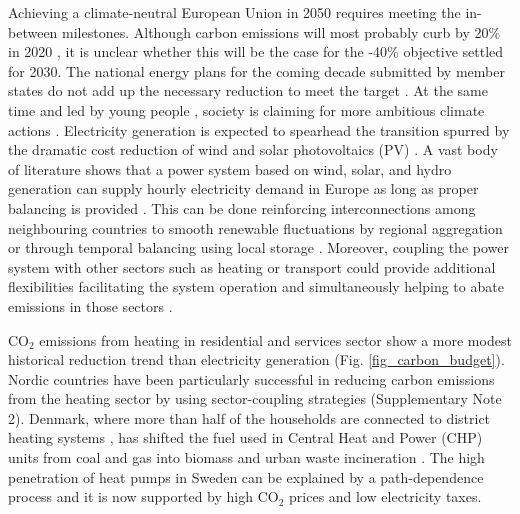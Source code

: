 \documentclass[5p]{elsarticle} %
\begin{document}
Achieving a climate-neutral European Union in 2050 \cite{in-depth_2018} requires meeting the in-between milestones. Although carbon emissions will most probably curb by 20\% in 2020 \cite{EEA_totalGHG}, it is unclear whether this will be the case for the -40\% objective settled for 2030. The national energy plans for the coming decade submitted by member states do not add up the necessary reduction to meet the target \cite{EU-appraisal_2019}. At the same time and led by young people \cite{Warren_2019}, society is claiming for more ambitious climate actions \cite{Rinscheid_2019}. Electricity generation is expected to spearhead the transition spurred by the dramatic cost reduction of wind \cite{Lantz_2012} and solar photovoltaics (PV) \cite{Creutzig_2017, Haegel_2019}. A vast body of literature shows that a power system based on wind, solar, and hydro generation can supply hourly electricity demand in Europe as long as proper balancing is provided 
\cite{Eriksen_2017, Schlachtberger_2017, Gils_2017a, Brown_response}. This can be done reinforcing interconnections among neighbouring countries \cite{Rodriguez_2014} to smooth renewable fluctuations by regional aggregation or through temporal balancing using local storage \cite{Rasmussen_2012, Cebulla_2017}. Moreover, coupling the power system with other sectors such as heating or transport could provide additional flexibilities facilitating the system operation and simultaneously helping to abate emissions in those sectors \cite{Connolly_2016, Brown_2018}. 

CO$_2$ emissions from heating in residential and services sector show a more modest historical reduction trend than electricity generation (Fig. \ref{fig_carbon_budget}). Nordic countries have been particularly successful in reducing carbon emissions from the heating sector by using sector-coupling strategies (Supplementary Note 2). Denmark, where more than half of the households are connected to district heating systems \cite{Gross_2019}, has shifted the fuel used in Central Heat and Power (CHP) units from coal and gas into biomass and urban waste incineration \cite{}. The high penetration of heat pumps in Sweden can be explained by a path-dependence process \cite{Gross_2019} and it is now supported by high CO$_2$ prices \cite{Carbon_pricing_2019} and low electricity taxes. 
\end{document}

